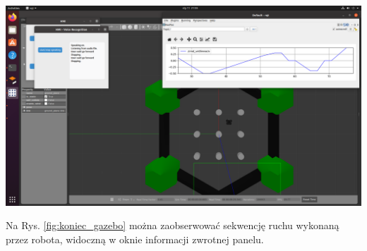 \begin{center}
    \includegraphics[width=1\linewidth]{files/koniec.png}
    \label{fig:koniec_gazebo}
\end{center}

Na Rys. \ref{fig:koniec_gazebo} można zaobserwować sekwencję ruchu wykonaną przez robota, widoczną w oknie informacji zwrotnej panelu. 
